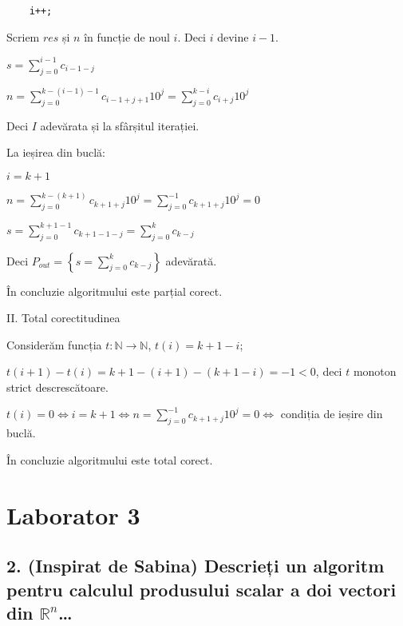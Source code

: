 \documentclass[11pt]{article}
\begin{document}
\begin{verbatim}
    i++;
\end{verbatim}

Scriem $\mathit{res}$ și $n$ în funcție de noul $i$. Deci $i$ devine $i-1$.


$s = \sum\limits_{j=0}^{i-1}c_{i-1-j}$

$n = \sum\limits_{j=0}^{k-(i-1)-1}c_{i-1+j+1}10^{j} = \sum\limits_{j=0}^{k-i}c_{i+j}10^{j} $

Deci $I$ adevărata și la sfârșitul iterației.


\vspace{14pt}
La ieșirea din buclă:

$i = k + 1$

$n = \sum\limits_{j=0}^{k-(k+1)}c_{k+1+j}10^{j}
= \sum\limits_{j=0}^{-1}c_{k+1+j}10^{j} = 0$

$s = \sum\limits_{j=0}^{k+1-1}c_{k+1-1-j}
= \sum\limits_{j=0}^{k}c_{k-j}$

Deci $P_{out} = \left\{ s = \sum\limits_{j=0}^{k} c_{k-j} \right\} $ adevărată.

În concluzie algoritmului este parțial corect.

\vspace{14pt}
\noindent
II. Total corectitudinea
\newline

Considerăm funcția $t: \mathbb{N} \to \mathbb{N}$, $t(i) = k + 1 - i$;

$t(i + 1) - t(i) = k + 1 - (i + 1) - (k + 1 - i) = -1 < 0$, deci $t$ monoton strict descrescătoare.

$t(i) = 0 \iff i = k + 1 \iff n = \sum\limits_{j=0}^{-1}c_{k+1+j}10^{j} = 0\iff$ condiția de ieșire din buclă.

În concluzie algoritmului este total corect.

\pagebreak
\section*{Laborator 3}
\label{sec:org4fecee6}
\subsection*{2. (Inspirat de Sabina) Descrieți un algoritm pentru calculul produsului scalar a doi vectori din \(\mathbb{R}^n\)\ldots{}}
\label{sec:org4f89105}
\end{document}
